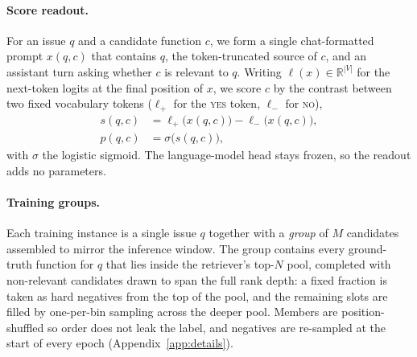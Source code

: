 \paragraph{Score readout.}
For an issue $q$ and a candidate function $c$, we form a single
chat-formatted prompt $x(q, c)$ that contains $q$, the
token-truncated source of $c$, and an assistant turn asking whether
$c$ is relevant to $q$. Writing $\ell(x) \in \mathbb{R}^{|V|}$ for
the next-token logits at the final position of $x$, we score $c$ by
the contrast between two fixed vocabulary tokens
($\ell_{+}$ for the \textsc{yes} token, $\ell_{-}$ for \textsc{no}),
\begin{equation}
\begin{aligned}
  s(q,c) &= \ell_{+}\!\bigl(x(q,c)\bigr) - \ell_{-}\!\bigl(x(q,c)\bigr), \\
  p(q,c) &= \sigma\!\bigl(s(q,c)\bigr),
\end{aligned}
  \label{eq:score}
\end{equation}
with $\sigma$ the logistic sigmoid. The language-model head stays
frozen, so the readout adds no parameters.

\paragraph{Training groups.}
Each training instance is a single issue $q$ together with a
\emph{group} of $M$ candidates assembled to mirror the inference
window. The group contains every ground-truth function for $q$
that lies inside the retriever's top-$N$ pool, completed with
non-relevant candidates drawn to span the full rank depth: a fixed
fraction is taken as hard negatives from the top of the pool, and
the remaining slots are filled by one-per-bin sampling across the
deeper pool. Members are position-shuffled so order does not leak
the label, and negatives are re-sampled at the start of every
epoch (Appendix~\ref{app:details}).

